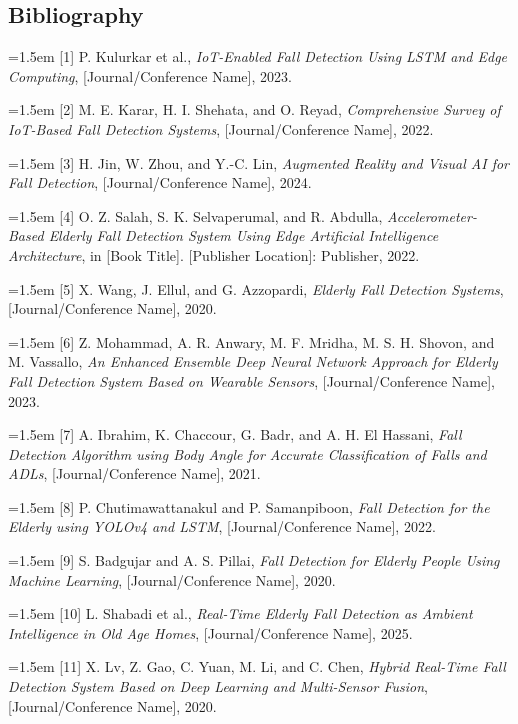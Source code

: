 \begin{center}
    \chapter*{Bibliography}
\end{center}

\noindent
\hangindent=1.5em [1] P. Kulurkar et al., \textit{IoT-Enabled Fall Detection Using LSTM and Edge Computing}, [Journal/Conference Name], 2023.

\hangindent=1.5em [2] M. E. Karar, H. I. Shehata, and O. Reyad, \textit{Comprehensive Survey of IoT-Based Fall Detection Systems}, [Journal/Conference Name], 2022.

\hangindent=1.5em [3] H. Jin, W. Zhou, and Y.-C. Lin, \textit{Augmented Reality and Visual AI for Fall Detection}, [Journal/Conference Name], 2024.

\hangindent=1.5em [4] O. Z. Salah, S. K. Selvaperumal, and R. Abdulla, \textit{Accelerometer-Based Elderly Fall Detection System Using Edge Artificial Intelligence Architecture}, in [Book Title]. [Publisher Location]: Publisher, 2022.

\hangindent=1.5em [5] X. Wang, J. Ellul, and G. Azzopardi, \textit{Elderly Fall Detection Systems}, [Journal/Conference Name], 2020.

\hangindent=1.5em [6] Z. Mohammad, A. R. Anwary, M. F. Mridha, M. S. H. Shovon, and M. Vassallo, \textit{An Enhanced Ensemble Deep Neural Network Approach for Elderly Fall Detection System Based on Wearable Sensors}, [Journal/Conference Name], 2023.

\hangindent=1.5em [7] A. Ibrahim, K. Chaccour, G. Badr, and A. H. El Hassani, \textit{Fall Detection Algorithm using Body Angle for Accurate Classification of Falls and ADLs}, [Journal/Conference Name], 2021.

\hangindent=1.5em [8] P. Chutimawattanakul and P. Samanpiboon, \textit{Fall Detection for the Elderly using YOLOv4 and LSTM}, [Journal/Conference Name], 2022.

\hangindent=1.5em [9] S. Badgujar and A. S. Pillai, \textit{Fall Detection for Elderly People Using Machine Learning}, [Journal/Conference Name], 2020.

\hangindent=1.5em [10] L. Shabadi et al., \textit{Real-Time Elderly Fall Detection as Ambient Intelligence in Old Age Homes}, [Journal/Conference Name], 2025.

\hangindent=1.5em [11] X. Lv, Z. Gao, C. Yuan, M. Li, and C. Chen, \textit{Hybrid Real-Time Fall Detection System Based on Deep Learning and Multi-Sensor Fusion}, [Journal/Conference Name], 2020.

